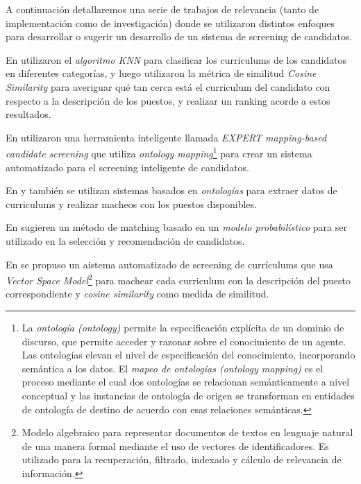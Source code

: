 \documentclass[12pt,a4paper]{article}
\begin{document}
\begin{sloppypar}
A continuación detallaremos una serie de trabajos de relevancia (tanto de implementación como de investigación) donde se utilizaron distintos enfoques para desarrollar o sugerir un desarrollo de un sistema de screening de candidatos.

En \cite{trabajos_relacionados_1} utilizaron el \textit{algoritmo KNN} para clasificar los curriculums de los candidatos en diferentes categorías, y luego utilizaron la métrica de similitud \textit{Cosine Similarity} para averiguar qué tan cerca está el curriculum del candidato con respecto a la descripción de los puestos, y realizar un ranking acorde a estos resultados.

En \cite{trabajos_relacionados_2} utilizaron una herramienta inteligente llamada \textit{EXPERT mapping-based candidate screening} que utiliza  \textit{ontology mapping}\footnote{La \textit{ontología (ontology)} permite la especificación explícita de un dominio de discurso, que permite acceder y razonar sobre el conocimiento de un agente. Las ontologías elevan el nivel de especificación del conocimiento, incorporando semántica a los datos.
El \textit{mapeo de ontologías (ontology mapping)} es el proceso mediante el cual dos ontologías se relacionan semánticamente a nivel conceptual y las instancias de ontología de origen se transforman en entidades de ontología de destino de acuerdo con esas relaciones semánticas.\cite{ontology_mapping} } para crear un sistema automatizado para el screening inteligente de candidatos. 

En \cite{trabajos_relacionados_3} y \cite{trabajos_relacionados_4} también se utilizan sistemas basados en \textit{ontologías} para extraer datos de curriculums y realizar macheos con los puestos disponibles.

En \cite{trabajos_relacionados_5} sugieren un método de matching basado en un \textit{modelo probabilístico} para ser utilizado en la selección y recomendación de candidatos. 

En \cite{trabajos_relacionados_6} se propuso un aistema automatizado de screening de currículums que usa \textit{Vector Space Model}\footnote{Modelo algebraico para representar documentos de textos en lenguaje natural de una manera formal mediante el uso de vectores de identificadores. Es utilizado para la recuperación, filtrado, indexado y cálculo de relevancia de información.} para machear cada curriculum con la descripción del puesto correspondiente y \textit{cosine similarity} como medida de similitud.

\cleardoublepage    %


\end{sloppypar}
\end{document}
